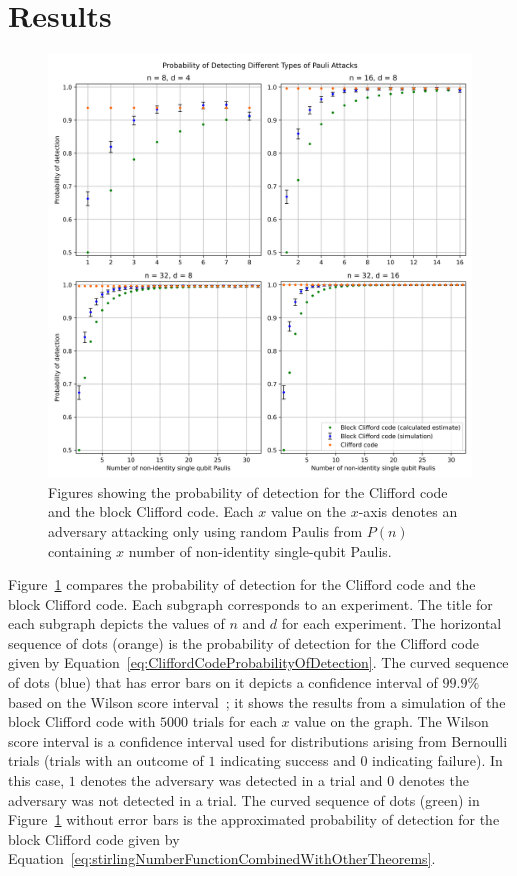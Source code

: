 \section{Results}
\begin{figure}
    \centering
    \includegraphics[scale=0.6]{Figures/multi_graph_pauli_attacks.png}
    \caption{Figures showing the probability of detection for the Clifford code and the block Clifford code. Each $x$ value on the $x$-axis denotes an adversary attacking only using random Paulis from $P(n)$ containing $x$ number of non-identity single-qubit Paulis.}
    \label{fig:multiGraphPaulAttacks}
\end{figure}

Figure~\ref{fig:multiGraphPaulAttacks} compares the probability of detection for the Clifford code and the block Clifford code. Each subgraph corresponds to an experiment. The title for each subgraph depicts the values of $n$ and $d$ for each experiment. The horizontal sequence of dots (orange) is the probability of detection for the Clifford code given by Equation~\eqref{eq:CliffordCodeProbabilityOfDetection}. The curved sequence of dots (blue) that has error bars on it depicts a confidence interval of $99.9 \%$ based on the Wilson score interval~\cite{wilsonScoreInterval}; it shows the results from a simulation of the block Clifford code with $5000$ trials for each $x$ value on the graph. The Wilson score interval is a confidence interval used for distributions arising from Bernoulli trials (trials with an outcome of $1$ indicating success and $0$ indicating failure). In this case, $1$ denotes the adversary was detected in a trial and $0$ denotes the adversary was not detected in a trial. The curved sequence of dots (green) in Figure~\ref{fig:multiGraphPaulAttacks} without error bars is the approximated probability of detection for the block Clifford code given by Equation~\eqref{eq:stirlingNumberFunctionCombinedWithOtherTheorems}. 

